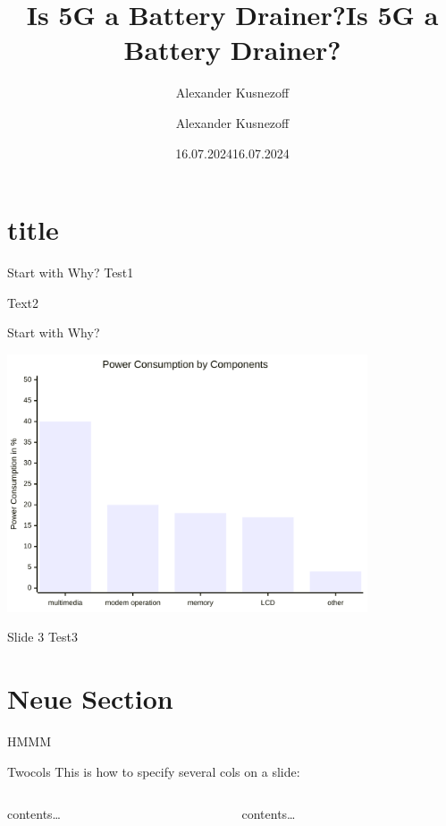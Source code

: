 \documentclass[
  ignorenonframetext,
  twocolumn]{beamer}
\title{Is 5G a Battery Drainer?}
\author{Alexander Kusnezoff}
\date{16.07.2024}
\title{Is 5G a Battery Drainer?}
\subtitle{}
\author{Alexander Kusnezoff}
\date{16.07.2024}
\begin{document}
\maketitle

% 

\section{title}\label{title}

\begin{frame}{Start with Why?}
\protect{}\label{start-with-why}
Test1

\pause 

Text2
\end{frame}

\begin{frame}{Start with Why?}
\protect{}\label{start-with-why-1}
\begin{center}
\includegraphics[width=0.8\textwidth]{./img/prosem-einleitung.png}
\end{center}
\end{frame}

\begin{frame}{Slide 3}
\protect{}\label{slide-3}
Test3
\end{frame}

\section{Neue Section}\label{neue-section}

\begin{frame}{HMMM}
\protect{}\label{hmmm}
\end{frame}

\begin{frame}{Twocols}
\protect{}\label{twocols}
This is how to specify several cols on a slide:

\begin{columns}[T]
\begin{column}{0.4\linewidth}
contents\ldots{}
\end{column}

\begin{column}{0.6\linewidth}
contents\ldots{}
\end{column}
\end{columns}
\end{frame}
\end{document}
